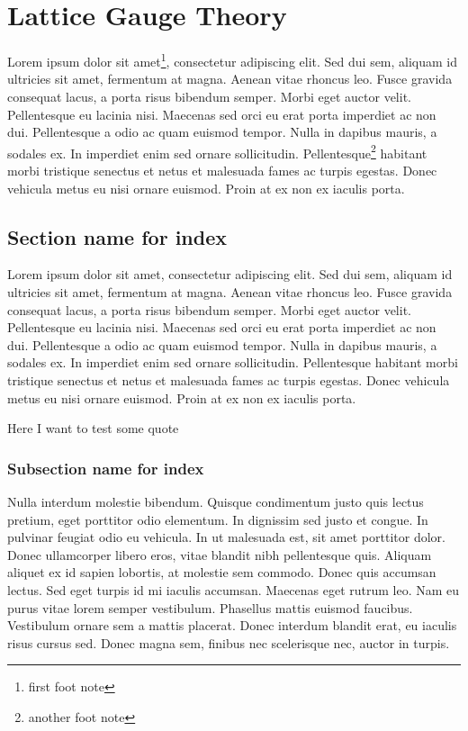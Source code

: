 \chapter[LGT]{Lattice Gauge Theory}
Lorem ipsum dolor sit amet\footnote{first foot note}, consectetur adipiscing elit. Sed dui sem, aliquam id ultricies sit amet, fermentum at magna. Aenean vitae rhoncus leo. Fusce gravida consequat lacus, a porta risus bibendum semper. Morbi eget auctor velit. Pellentesque eu lacinia nisi. Maecenas sed orci eu erat porta imperdiet ac non dui. Pellentesque a odio ac quam euismod tempor. Nulla in dapibus mauris, a sodales ex. In imperdiet enim sed ornare sollicitudin. Pellentesque\footnote{another foot note} habitant morbi tristique senectus et netus et malesuada fames ac turpis egestas. Donec vehicula metus eu nisi ornare euismod. Proin at ex non ex iaculis porta.

\section[Section name]{Section name for index}
Lorem ipsum dolor sit amet, consectetur adipiscing elit. Sed dui sem, aliquam id ultricies sit amet, fermentum at magna. Aenean vitae rhoncus leo. Fusce gravida consequat lacus, a porta risus bibendum semper. Morbi eget auctor velit. Pellentesque eu lacinia nisi. Maecenas sed orci eu erat porta imperdiet ac non dui. Pellentesque a odio ac quam euismod tempor. Nulla in dapibus mauris, a sodales ex. In imperdiet enim sed ornare sollicitudin. Pellentesque habitant morbi tristique senectus et netus et malesuada fames ac turpis egestas. Donec vehicula metus eu nisi ornare euismod. Proin at ex non ex iaculis porta.

Here I want to test\cite{einstein} some\cite{latexcompanion} quote\cite{knuthwebsite}

\subsection[Subsection name]{Subsection name for index}
Nulla interdum molestie bibendum. Quisque condimentum justo quis lectus pretium, eget porttitor odio elementum. In dignissim sed justo et congue. In pulvinar feugiat odio eu vehicula. In ut malesuada est, sit amet porttitor dolor. Donec ullamcorper libero eros, vitae blandit nibh pellentesque quis. Aliquam aliquet ex id sapien lobortis, at molestie sem commodo. Donec quis accumsan lectus. Sed eget turpis id mi iaculis accumsan. Maecenas eget rutrum leo. Nam eu purus vitae lorem semper vestibulum. Phasellus mattis euismod faucibus. Vestibulum ornare sem a mattis placerat. Donec interdum blandit erat, eu iaculis risus cursus sed. Donec magna sem, finibus nec scelerisque nec, auctor in turpis.

